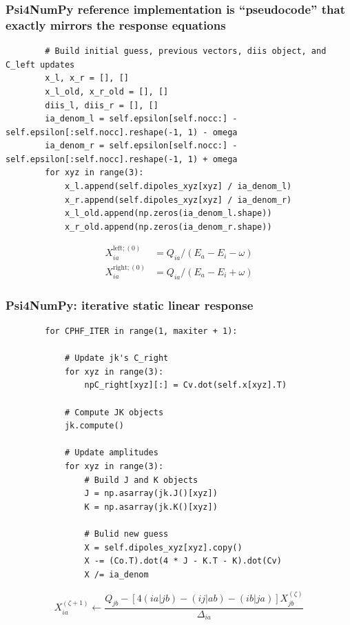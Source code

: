\documentclass[%
    xcolor=usenames,dvipsnames,svgnames%
]{beamer}
\begin{document}
\begin{frame}[fragile]
  \frametitle{Psi4NumPy reference implementation is ``pseudocode'' that exactly mirrors the response equations}
  \begin{verbatim}
        # Build initial guess, previous vectors, diis object, and C_left updates
        x_l, x_r = [], []
        x_l_old, x_r_old = [], []
        diis_l, diis_r = [], []
        ia_denom_l = self.epsilon[self.nocc:] - self.epsilon[:self.nocc].reshape(-1, 1) - omega
        ia_denom_r = self.epsilon[self.nocc:] - self.epsilon[:self.nocc].reshape(-1, 1) + omega
        for xyz in range(3):
            x_l.append(self.dipoles_xyz[xyz] / ia_denom_l)
            x_r.append(self.dipoles_xyz[xyz] / ia_denom_r)
            x_l_old.append(np.zeros(ia_denom_l.shape))
            x_r_old.append(np.zeros(ia_denom_r.shape))
  \end{verbatim}
  \begin{align*}
    X_{ia}^{\text{left};(0)} &= Q_{ia} / (E_{a} - E_{i} - \omega) \\
    X_{ia}^{\text{right};(0)} &= Q_{ia} / (E_{a} - E_{i} + \omega)
  \end{align*}
\end{frame}

\begin{frame}[fragile]
  \frametitle{Psi4NumPy: iterative static linear response}
  \begin{verbatim}
        for CPHF_ITER in range(1, maxiter + 1):

            # Update jk's C_right
            for xyz in range(3):
                npC_right[xyz][:] = Cv.dot(self.x[xyz].T)

            # Compute JK objects
            jk.compute()

            # Update amplitudes
            for xyz in range(3):
                # Build J and K objects
                J = np.asarray(jk.J()[xyz])
                K = np.asarray(jk.K()[xyz])

                # Bulid new guess
                X = self.dipoles_xyz[xyz].copy()
                X -= (Co.T).dot(4 * J - K.T - K).dot(Cv)
                X /= ia_denom
  \end{verbatim}
  \begin{equation*}
    X_{ia}^{(\zeta+1)} \leftarrow \frac{Q_{jb} - \left[4(ia|jb) - (ij|ab) - (ib|ja)\right] X_{jb}^{(\zeta)}}{\Delta_{ia}}
  \end{equation*}
\end{frame}
\end{document}
